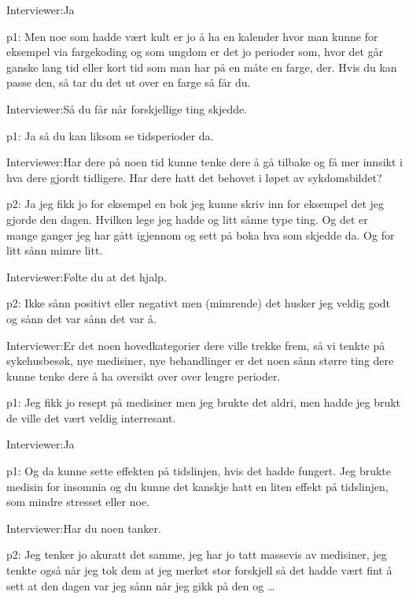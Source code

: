\documentclass[../../MasterThesis.tex]{subfiles}
\begin{document}
\textcolor{myBlue} {Interviewer:}Ja

\textcolor{myGreen} {p1:} Men noe som hadde vært kult er jo å ha en kalender hvor man kunne for eksempel via fargekoding og som ungdom er det jo perioder som, hvor det går ganske lang tid eller kort tid som man har på en måte en farge, der. Hvis du kan passe den, så tar du det ut over en farge så får du.

\textcolor{myBlue} {Interviewer:}Så du får når forskjellige ting skjedde. 

\textcolor{myGreen} {p1:} Ja så du kan liksom se tidsperioder da.

\textcolor{myBlue} {Interviewer:}Har dere på noen tid kunne tenke dere å gå tilbake og få mer innsikt i hva dere gjordt tidligere. Har dere hatt det behovet i løpet av sykdomsbildet?

\textcolor{myYellow} {p2:} Ja jeg fikk jo for eksempel en bok jeg kunne skriv inn for eksempel det jeg gjorde den dagen. Hvilken lege jeg hadde og litt sånne type ting. Og det er mange ganger jeg har gått igjennom og sett på boka hva som skjedde da. Og for litt sånn mimre litt. 

\textcolor{myBlue} {Interviewer:}Følte du at det hjalp.

\textcolor{myYellow} {p2:} Ikke sånn positivt eller negativt men (mimrende) det husker jeg veldig godt og sånn det var sånn det var å.

\textcolor{myBlue} {Interviewer:}Er det noen hovedkategorier dere ville trekke frem, så vi tenkte på sykehusbesøk, nye medisiner, nye behandlinger er det noen sånn større ting dere kunne tenke dere å ha oversikt over over lengre perioder.

\textcolor{myGreen} {p1:} Jeg fikk jo resept på medisiner men jeg brukte det aldri, men hadde jeg brukt de ville det vært veldig interresant.

\textcolor{myBlue} {Interviewer:}Ja

\textcolor{myGreen} {p1:} Og da kunne sette effekten på tidslinjen, hvis det hadde fungert. Jeg brukte medisin for insomnia og du kunne det kanskje hatt en liten effekt på tidslinjen, som mindre stresset eller noe.

\textcolor{myBlue} {Interviewer:}Har du noen tanker.

\textcolor{myYellow} {p2:} Jeg tenker jo akuratt det samme, jeg har jo tatt massevis av medisiner, jeg tenkte også når jeg tok dem at jeg merket stor forskjell så det hadde vært fint å sett at den dagen var jeg sånn når jeg gikk på den og \dots
\end{document}

